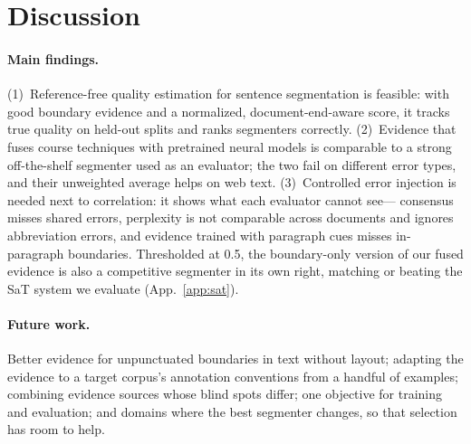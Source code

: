 
\section{Discussion}
\label{sec:discussion}

\paragraph{Main findings.} (1)~Reference-free quality estimation for sentence segmentation is feasible: with good
boundary evidence and a normalized, document-end-aware score, it tracks true quality on held-out splits and ranks
segmenters correctly. (2)~Evidence that fuses course techniques with pretrained neural models is comparable to a strong
off-the-shelf segmenter used as an evaluator; the two fail on different error types, and their unweighted average helps
on web text. (3)~Controlled error injection is needed next to correlation: it shows what each evaluator cannot see---
consensus misses shared errors, perplexity is not comparable across documents and ignores abbreviation errors, and
evidence trained with paragraph cues misses in-paragraph boundaries. Thresholded at 0.5, the boundary-only version
of our fused evidence is also a competitive segmenter in its own right, matching or beating the SaT system we evaluate
(App.~\ref{app:sat}).

\paragraph{Future work.} Better evidence for unpunctuated boundaries in text without layout; adapting the evidence to a
target corpus's annotation conventions from a handful of examples; combining evidence sources whose blind spots differ;
one objective for training and evaluation; and domains where the best segmenter changes, so that selection has room to
help.
